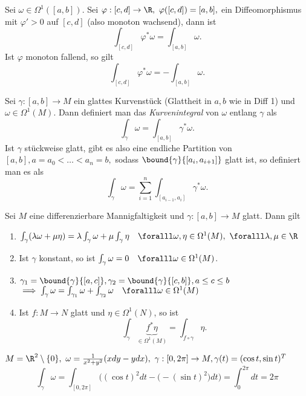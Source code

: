 \begin{lem}
	Sei $ \omega \in \Omega^1([a,b]) $. Sei $ \varphi:[c,d] \to \R,\ \varphi([c,d]) = [a,b], $ ein Diffeomorphismus mit $\varphi' > 0$ auf $[c,d]$ (also monoton wachsend), dann ist
	\[ \int_{[c,d]} \varphi^*\omega = \int_{[a,b]} \omega. \]
	Ist $\varphi$ monoton fallend, so gilt
	\[ \int_{[c,d]} \varphi^*\omega = - \int_{[a,b]} \omega. \]
\end{lem}

\begin{defn}[Kurvenintegral]\label{3.30}
	Sei $ \gamma: [a,b] \to M $ ein glattes Kurvenstück (Glattheit in $a,b$ wie in Diff 1) und $\omega \in \Omega^1(M)$. Dann definiert man das \emph{Kurvenintegral} von $\omega$ entlang $\gamma$ als
	\[ \int_\gamma \omega = \int_{[a,b]} \gamma^*\omega. \]
	Ist $\gamma$ stückweise glatt, gibt es also eine endliche Partition von $[a,b], a=a_0 < \dots < a_n = b,$ sodass $\bound{\gamma}{[a_i,a_{i+1}]}$ glatt ist, so definiert man es als 
	$$ \int_{\gamma} \omega = \sum_{i=1}^{n} \int_{[a_{i-1},a_i]} \gamma^*\omega. $$
\end{defn}

\begin{lem}
	Sei $M$ eine differenzierbare Mannigfaltigkeit und $\gamma: [a,b] \to M$ glatt. Dann gilt
	\begin{enumerate}[label={\roman*})]
		\item $ \int_\gamma (\lambda \omega + \mu \eta) = \lambda \int_\gamma \omega + \mu \int_\gamma \eta \quad \foralll \omega,\eta \in \Omega^1(M), \ \foralll \lambda,\mu \in \R $
		\item Ist $\gamma$ konstant, so ist $ \int_\gamma \omega = 0 \quad \foralll \omega \in \Omega^1(M) $.
		\item $ \gamma_1 = \bound{\gamma}{[a,c]}, \gamma_2 = \bound{\gamma}{[c,b]}, a \leq c \leq b $\\
			$ \implies \int_\gamma \omega = \int_{\gamma_1} \omega + \int_{\gamma_2} \omega\quad \foralll \omega \in \Omega^1(M) $
		\item Ist $ f: M \to N $ glatt und $\eta \in \Omega^1(N)$, so ist
		\[ \int_\gamma \underbrace{f^*\eta}_{\in \Omega^1(M)} = \int_{f \circ \gamma} \eta. \]
	\end{enumerate}
\end{lem}

\begin{exmp*}
	$ M = \R^2 \setminus \{0\},\ \omega = \frac{1}{x^2+y^2}(xdy-ydx),\ \gamma: [0,2\pi] \to M, \gamma(t) = (\cos t,\sin t)^T $\\
	\[ \int_\gamma \omega = \int_{[0,2\pi]} \Big( (\cos t)^2 dt - \big(-(\sin t)^2 \big) dt \Big) = \int_0^{2\pi} dt = 2\pi \]
\end{exmp*}

